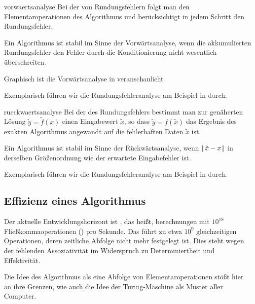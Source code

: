 \begin{Definition}{vorwaertsanalyse}
  Bei der  von Rundungsfehlern folgt man den
  Elementaroperationen des Algorithmus und berücksichtigt in jedem
  Schritt den Rundungsfehler.

  Ein Algorithmus ist stabil im Sinne der Vorwärtsanalyse, wenn die
  akkumulierten Rundungsfehler den Fehler durch die Konditionierung
  nicht wesentlich überschreiten.
\end{Definition}

\begin{remark}
  Graphisch ist die Vorwärtsanalyse in \cite[Abschnitt
  2.3.1]{DeuflhardHohmann08} veranschaulicht
\end{remark}

\begin{example}
  Exemplarisch führen wir die Rundungsfehleranalyse am Beispiel in
  \cite[Abschnitt 1.3.2]{Rannacher17} durch.
\end{example}

\begin{Definition}{rueckwaertsanalyse}
  Bei der  des Rundungsfehlers bestimmt man
  zur genäherten Lösung $\tilde y = \tilde f(x)$ einen Eingabewert
  $\tilde x$, so dass $\tilde y = f(\tilde x)$ das Ergebnis des
  exakten Algorithmus angewandt auf die fehlerhaften Daten $\tilde x$
  ist.

  Ein Algorithmus ist stabil im Sinne der Rückwärtsanalyse, wenn
  $\lVert\tilde x-x\rVert$ in derselben Größenordnung wie der erwartete
  Eingabefehler ist.
\end{Definition}

\begin{example}
  Exemplarisch führen wir die Rundungsfehleranalyse am Beispiel in
  \cite[Lemma 2.30]{DeuflhardHohmann08} durch.
\end{example}

\subsection{Effizienz eines Algorithmus}

\begin{remark}
  Der aktuelle Entwicklungshorizont ist ,
  das heißt, berechnungen mit $10^{18}$ Fließkommaoperationen
  () pro Sekunde. Das führt zu etwa $10^9$ gleichzeitigen
  Operationen, deren zeitliche Abfolge nicht mehr festgelegt ist. Dies
  steht wegen der fehlenden Assoziativität im Widerspruch zu
  Determiniertheit und Effektivität.

  Die Idee des Algorithmus als eine \glqq Abfolge von
  Elementaroperationen\grqq{} stößt hier an ihre Grenzen, wie auch die
  Idee der Turing-Maschine als Muster aller Computer.
\end{remark}

